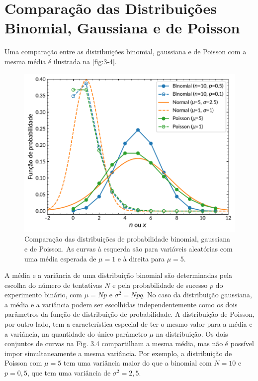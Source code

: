 \section{Comparação das Distribuições Binomial, Gaussiana e de Poisson}

Uma comparação entre as distribuições binomial, gaussiana e de Poisson com a mesma média é ilustrada na \autoref{fig:3-4}.

\begin{figure}
	\centering
	\includegraphics[width=0.7\linewidth]{Figuras/3-4.pdf}
	\caption{Comparação das distribuições de probabilidade binomial, gaussiana e de Poisson. As curvas à esquerda são para variáveis aleatórias com uma média esperada de $\mu = 1$ e à direita para $\mu = 5$.}
	\label{fig:3-4}
\end{figure}

A média e a variância de uma distribuição binomial são determinadas pela escolha do número de tentativas \( N \) e pela probabilidade de sucesso \( p \) do experimento binário, com \( \mu = Np \) e \( \sigma^2 = Npq \). No caso da distribuição gaussiana, a média e a variância podem ser escolhidas independentemente como os dois parâmetros da função de distribuição de probabilidade. A distribuição de Poisson, por outro lado, tem a característica especial de ter o mesmo valor para a média e a variância, na quantidade do único parâmetro \( \mu \) na distribuição. Os dois conjuntos de curvas na Fig. 3.4 compartilham a mesma média, mas não é possível impor simultaneamente a mesma variância. Por exemplo, a distribuição de Poisson com \( \mu = 5 \) tem uma variância maior do que a binomial com \( N = 10 \) e \( p = 0,5 \), que tem uma variância de \( \sigma^2 = 2,5 \).

